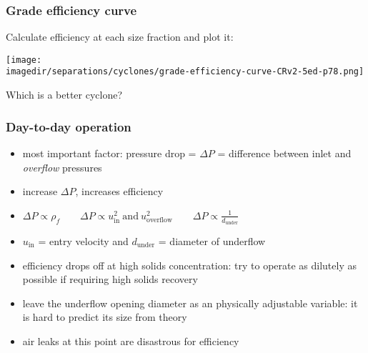 \begin{frame}\frametitle{Grade efficiency curve}
	Calculate efficiency at each size fraction and plot it:
	\begin{center}
		\texttt{[image: \\imagedir/separations/cyclones/grade-efficiency-curve-CRv2-5ed-p78.png]}
	\end{center}
	Which is a better cyclone?
\end{frame}

\begin{frame}\frametitle{Day-to-day operation}
	\begin{itemize}
		\item	most important factor: pressure drop = $\Delta P$ = difference between inlet and \emph{overflow} pressures
		\item	increase $\Delta P$, increases efficiency
		\item	$\Delta P \propto \rho_f \qquad  \Delta P \propto u_\text{in}^2~\text{and}~u_\text{overflow}^2 \qquad  \Delta P \propto \displaystyle\frac{1}{d_\text{under}}$
		\item	$u_\text{in}$ = entry velocity and $d_\text{under}$ = diameter of underflow
		\item	efficiency drops off at high solids concentration: try to operate as dilutely as possible if requiring high solids recovery
		\item	leave the underflow opening diameter as an physically adjustable variable: it is hard to predict its size from theory
		\item	air leaks at this point are disastrous for efficiency 
	\end{itemize}
\end{frame}

